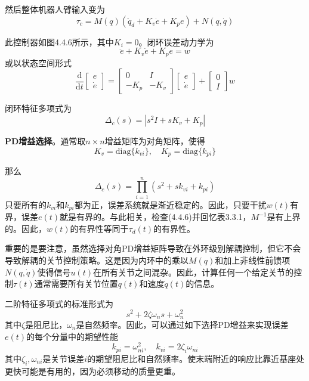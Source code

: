 \documentclass[UTF8]{ctexart}
\theoremstyle{definition}
\newcommand{\dd}{\mathrm{d}}
\begin{document}
然后整体机器人臂输入变为
\begin{equation}
    \tau_c = M(q)(\ddot{q}_d + K_v\dot{e} + K_pe) + N(q, \dot{q})
\end{equation}

此控制器如图4.4.6所示，其中$K_i = 0$。闭环误差动力学为
\begin{equation}
    \ddot{e} + K_v\dot{e} + K_pe = w
\end{equation}
或以状态空间形式
\begin{equation}
    \frac{\dd}{\dd t}\begin{bmatrix} e \\ \dot{e} \end{bmatrix} = \begin{bmatrix} 0 & I \\ -K_p & -K_v \end{bmatrix}\begin{bmatrix} e \\ \dot{e} \end{bmatrix} + \begin{bmatrix} 0 \\ I \end{bmatrix}w
\end{equation}

闭环特征多项式为
\begin{equation}
    \Delta_c(s) = |s^2I + sK_v + K_p|
\end{equation}

\textbf{PD增益选择}。通常取$n \times n$增益矩阵为对角矩阵，使得
\begin{equation}
    K_v = \mathrm{diag}\{k_{vi}\}, \quad K_p = \mathrm{diag}\{k_{pi}\}
\end{equation}

那么
\begin{equation}
    \Delta_c(s) = \prod_{i=1}^{n}\left(s^2 + sk_{vi} + k_{pi}\right)
\end{equation}
只要所有的$k_{vi}$和$k_{pi}$都为正，误差系统就是渐近稳定的。因此，只要干扰$w(t)$有界，误差$e(t)$就是有界的。与此相关，检查(4.4.6)并回忆表3.3.1，$M^{-1}$是有上界的。因此，$w(t)$的有界性等同于$\tau_d(t)$的有界性。

重要的是要注意，虽然选择对角PD增益矩阵导致在外环级别解耦控制，但它不会导致解耦的关节控制策略。这是因为内环中的乘以$M(q)$和加上非线性前馈项$N(q, \dot{q})$使得信号$u(t)$在所有关节之间混杂。因此，计算任何一个给定关节的控制$\tau(t)$通常需要所有关节位置$q(t)$和速度$\dot{q}(t)$的信息。

二阶特征多项式的标准形式为
\begin{equation}
    s^2 + 2\zeta\omega_ns + \omega_n^2
\end{equation}
其中$\zeta$是阻尼比，$\omega_n$是自然频率。因此，可以通过如下选择PD增益来实现误差$e(t)$的每个分量中的期望性能
\begin{equation}
    k_{pi} = \omega_{ni}^2, \quad k_{vi} = 2\zeta_i\omega_{ni}
\end{equation}
其中$\zeta_i, \omega_{ni}$是关节误差$i$的期望阻尼比和自然频率。使末端附近的响应比靠近基座处更快可能是有用的，因为必须移动的质量更重。
\end{document}
